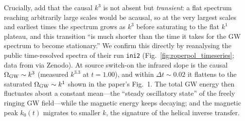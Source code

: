\documentclass[10pt,prd,aps,nobibnotes,superscriptaddress,preprintnumbers,notitlepage]{revtex4-1}
\begin{document}
Crucially, \cite{RoperPol:2019wvy} add that the causal $k^3$ is not absent but \emph{transient}:
a flat spectrum reaching arbitrarily large scales would be acausal, so at the very largest
scales and earliest times the spectrum grows as $k^3$ before saturating to the flat $k^1$
plateau, and this transition ``is much shorter than the time it takes for the GW spectrum to
become stationary.'' We confirm this directly by reanalysing the public time-resolved spectra
of their run \texttt{ini2} (Fig.~\ref{fig:roperpol_timeseries}; data from
\cite{RoperPol:2019wvy} via Zenodo). At source switch-on the infrared slope is the causal
$\Omega_{\rm GW}\sim k^{3}$ (measured $k^{3.3}$ at $t=1.00$), and within $\Delta t\sim0.02$
it flattens to the saturated $\Omega_{\rm GW}\sim k^{1}$ shown in the paper's Fig.~1. The
total GW energy then fluctuates about a constant mean---the ``steady oscillatory state'' of
the freely ringing GW field---while the magnetic energy keeps decaying; and the magnetic
peak $k_0(t)$ migrates to smaller $k$, the signature of the helical inverse transfer.
\end{document}
